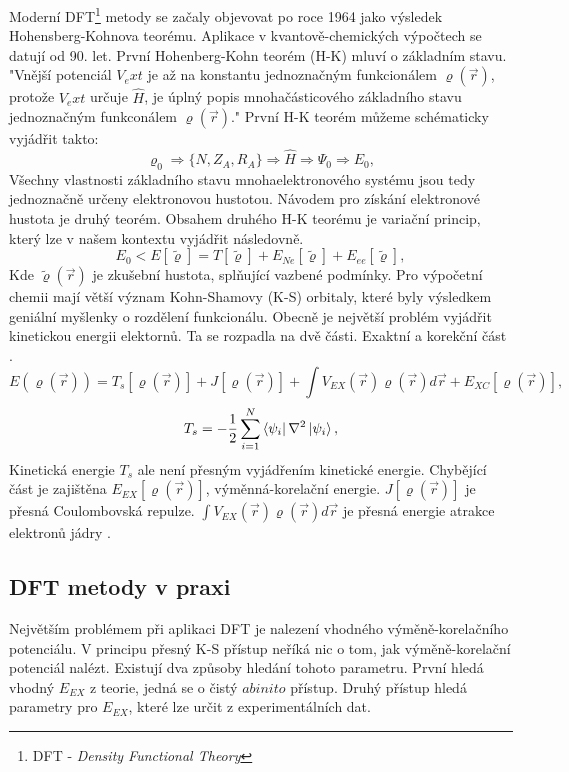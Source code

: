 \documentclass[
  digital, %
  table,   %
  lof,     %
  lot,     %
  oneside,
]{fithesis3}
\begin{document}
Moderní DFT\footnote{DFT - \textit{Density Functional Theory}} metody se začaly objevovat po roce 1964 jako výsledek Hohensberg-Kohnova teorému. Aplikace v kvantově-chemických výpočtech se datují od 90. let. První Hohenberg-Kohn teorém (H-K) mluví o základním stavu. "Vnější potenciál  $V_ext$ je až na konstantu jednoznačným funkcionálem $\varrho(\vec{r})$, protože $V_ext$ určuje $\widehat{H}$, je úplný popis mnohačásticového základního stavu jednoznačným funkconálem $\varrho(\vec{r})$."\cite{PhysRev.136.B864} První H-K teorém můžeme schématicky vyjádřit takto:
\begin{equation}
\varrho_0 \Rightarrow \{N, Z_A, R_A\} \Rightarrow \widehat{H} \Rightarrow \Psi_0 \Rightarrow E_0,
 \end{equation}
 Všechny vlastnosti základního stavu mnohaelektronového systému jsou tedy jednoznačně určeny elektronovou hustotou. Návodem pro získání elektronové hustota je druhý teorém. Obsahem druhého H-K teorému je variační princip, který lze v našem kontextu vyjádřit následovně.
\begin{equation}
E_0 < E [\tilde{\varrho}] = T[\tilde{\varrho}] + E_{Ne}[\tilde{\varrho}] + E_{ee}[\tilde{\varrho}],
\end{equation}
Kde $\tilde{\varrho}(\vec{r})$ je zkušební hustota, splňující vazbené podmínky. Pro výpočetní chemii mají větší význam Kohn-Shamovy (K-S) orbitaly, které byly výsledkem geniální myšlenky o rozdělení funkcionálu. Obecně je největší problém vyjádřit kinetickou energii elektornů. Ta se rozpadla na dvě části. Exaktní a korekční část  \cite{jensen2007introduction}\cite{koch2000chemist}.
\begin{equation}
E(\varrho(\vec{r})) = T_s[\varrho(\vec{r})] + J[\varrho(\vec{r})] + \int V_{EX}(\vec{r})\varrho(\vec{r})d\vec{r} + E_{XC}[\varrho(\vec{r})],
\end{equation}
 \begin{equation}
 T_s = -\frac{1}{2} \sum_{i=1}^{N}  \bra{\psi_i}{\nabla^{2}}\ket{\psi_i},
 \label{kineticka_energie_jednoelektronova}
 \end{equation}
 Kinetická energie $T_s$ ale není přesným vyjádřením kinetické energie. Chybějící část je zajištěna $E_{EX}[\varrho(\vec{r})]$, výměnná-korelační energie. $J[\varrho(\vec{r})]$ je přesná Coulombovská repulze. $\int V_{EX}(\vec{r})\varrho(\vec{r})d\vec{r}$ je přesná energie atrakce elektronů jádry \cite{parr1994density}.

\subsection{DFT metody v praxi}
Největším problémem při aplikaci DFT je nalezení vhodného výměně-korelačního potenciálu. V principu přesný K-S přístup neříká nic o tom, jak výměně-korelační potenciál nalézt. Existují dva způsoby hledání tohoto parametru. První hledá vhodný $E_{EX}$ z teorie, jedná se o čistý $ab inito$ přístup. Druhý přístup hledá parametry pro $E_{EX}$, které lze určit z experimentálních dat.
\end{document}
